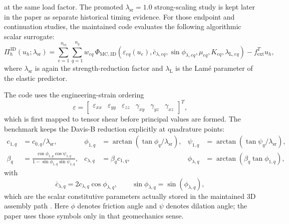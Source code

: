 at the same load factor. The promoted $\lambda_{\mathrm{sr}}=1.0$ strong-scaling
study is kept later in the paper as separate historical timing evidence.
For those endpoint and continuation studies, the maintained code evaluates the
following algorithmic scalar surrogate:
\begin{equation}
  \Pi_h^{3\mathrm{D}}(u_h;\lambda_{\mathrm{sr}})
  =
  \sum_{e=1}^{n_{\mathrm{el}}}
  \sum_{q=1}^{n_q}
    w_{eq}\,
    \Phi_{\mathrm{MC},3\mathrm{D}}
    \!\left(
      \varepsilon_{eq}(u_e),
      \bar c_{\lambda,eq},
      \sin \phi_{\lambda,eq},
      \mu_{eq},
      K_{eq},
      \lambda_{\mathrm{L},eq}
    \right)
  - f_{\mathrm{ext}}^T u_h,
  \label{eq:plasticity3d-discrete}
\end{equation}
where $\lambda_{\mathrm{sr}}$ is again the strength-reduction factor and
$\lambda_{\mathrm{L}}$ is the Lam{\'e} parameter of the elastic predictor.

The code uses the engineering-strain ordering
\begin{equation}
  \varepsilon
  =
  \begin{bmatrix}
    \varepsilon_{xx} &
    \varepsilon_{yy} &
    \varepsilon_{zz} &
    \gamma_{xy} &
    \gamma_{yz} &
    \gamma_{xz}
  \end{bmatrix}^{T},
  \label{eq:plasticity3d-engineering-strain}
\end{equation}
which is first mapped to tensor shear before principal values are formed. The
benchmark keeps the Davis-B reduction explicitly at quadrature points:
\begin{align}
  c_{1,q} &= c_{0,q}/\lambda_{\mathrm{sr}},
  &
  \phi_{1,q} &= \arctan\!\left(\tan\phi_q/\lambda_{\mathrm{sr}}\right),
  &
  \psi_{1,q} &= \arctan\!\left(\tan\psi_q/\lambda_{\mathrm{sr}}\right),
  \nonumber\\
  \beta_q &= \frac{\cos\phi_{1,q}\cos\psi_{1,q}}
                 {1-\sin\phi_{1,q}\sin\psi_{1,q}},
  &
  c_{\lambda,q} &= \beta_q c_{1,q},
  &
  \phi_{\lambda,q} &= \arctan\!\left(\beta_q \tan\phi_{1,q}\right),
  \label{eq:plasticity3d-davis}
\end{align}
with
\begin{equation}
  \bar c_{\lambda,q} = 2 c_{\lambda,q}\cos\phi_{\lambda,q},
  \qquad
  \sin\phi_{\lambda,q} = \sin(\phi_{\lambda,q}),
  \label{eq:plasticity3d-davis-bar}
\end{equation}
which are the scalar constitutive parameters actually stored in the maintained
3D assembly path
\citep{davis1968plasticity,tschuchnigg2015nonassociated,sysala2021optimization}.
Here $\phi$ denotes friction angle and $\psi$ denotes dilation angle; the paper
uses those symbols only in that geomechanics sense.

